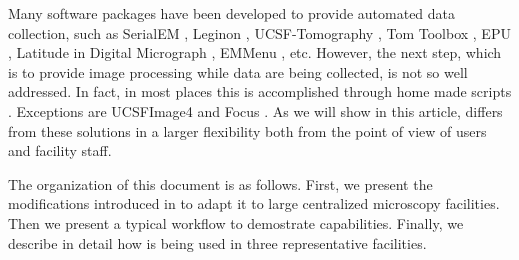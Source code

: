 Many software packages have been developed to provide automated data collection, such as SerialEM \citep{Mastronarde2005}, Leginon \citep{Suloway2009}, UCSF-Tomography \citep{Zheng2007}, Tom Toolbox \citep{Nickell2005}, EPU \citep{EPU}, Latitude in Digital Micrograph \citep{Latitude}, EMMenu \citep{emmenu}, etc. However, the next step,  which is to provide image processing while  data are being collected, is not so well addressed. In fact, in most places this is accomplished through home made scripts \citep[i.e.][]{Pichkur2018}. %
Exceptions are UCSFImage4 \citep{Li2015} and Focus \citep{Biyani2017}. As we will show in this article, \scipion differs from these solutions in a larger flexibility both from the point of view of users and facility staff.

The organization of this document is as follows. First, we present the modifications introduced in \scipion to adapt it to large centralized microscopy facilities. Then we present a typical workflow to demostrate \scipion capabilities. Finally,  we describe in detail how \scipion is being used in three representative facilities.

